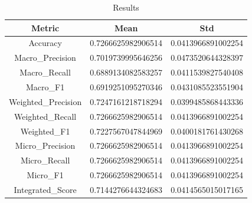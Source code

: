 \begin{table}[htbp]
\centering
\caption{Results}
\label{tab:csv}
\small
\setlength{\tabcolsep}{4pt}
\begin{tabular}{|c|c|c|}
\hline
Metric & Mean & Std \\
\hline
Accuracy & 0.7266625982906514 & 0.0413966891002254 \\
Macro_Precision & 0.7019739995646256 & 0.0473520644328397 \\
Macro_Recall & 0.6889134082583257 & 0.0411539827540408 \\
Macro_F1 & 0.6919251095270346 & 0.0431085523551904 \\
Weighted_Precision & 0.7247161218718294 & 0.0399485868443336 \\
Weighted_Recall & 0.7266625982906514 & 0.0413966891002254 \\
Weighted_F1 & 0.7227567047844969 & 0.0400181761430268 \\
Micro_Precision & 0.7266625982906514 & 0.0413966891002254 \\
Micro_Recall & 0.7266625982906514 & 0.0413966891002254 \\
Micro_F1 & 0.7266625982906514 & 0.0413966891002254 \\
Integrated_Score & 0.7144276644324683 & 0.0414565015017165 \\
\hline
\end{tabular}
\end{table}